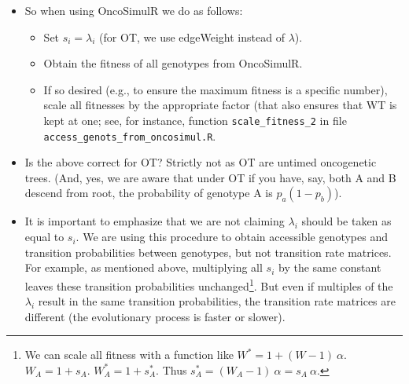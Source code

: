 \documentclass[11pt]{article}
\begin{document}
\begin{itemize}
\item So when using OncoSimulR we do as follows:
\begin{itemize}
\item Set \(s_i = \lambda_i\) (for OT, we use edgeWeight instead of \(\lambda\)).
\item Obtain the fitness of all genotypes from OncoSimulR.
\item If so desired (e.g., to ensure the maximum fitness is a specific number),  scale all fitnesses by the appropriate factor (that also ensures that WT is kept at one; see, for instance, function \texttt{scale\_fitness\_2} in file \texttt{access\_genots\_from\_oncosimul.R}.
\end{itemize}

\item Is the above correct for OT? Strictly not as OT are untimed oncogenetic trees. (And, yes, we are aware that under OT if you have, say, both A and B descend from root, the probability of genotype A is $p_a (1 - p_b)$).

\item It is important to emphasize that we are not claiming $\lambda_i$ should be taken as equal to $s_i$. We are using this procedure to obtain accessible genotypes and transition probabilities between genotypes, but not transition rate matrices. For example, as mentioned above, multiplying all $s_i$ by the same constant leaves these transition probabilities unchanged\footnote{
    We can scale all fitness with a function like $W^* = 1 + (W - 1)\ \alpha$. \\
    $W_A = 1 + s_A$. $W_A^*= 1 + s_A^*$. Thus $s_A^*= (W_A - 1)\ \alpha = s_A\  \alpha$.}. But even if multiples of the $\lambda_i$ result in the same transition probabilities, the transition rate matrices are different (the evolutionary process is faster or slower).
  
\end{itemize}
\end{document}
